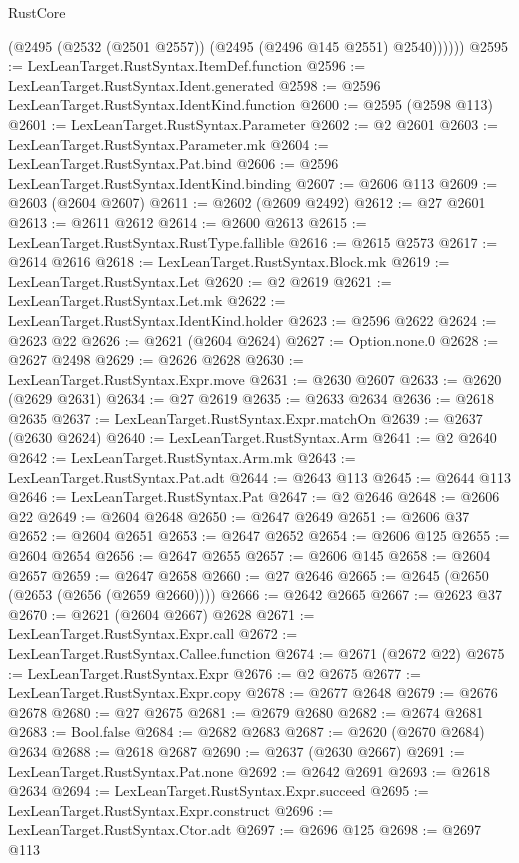 \begin{lexlean}{RustCore}
\begin{coremodule}
            (@2495 (@2532 (@2501 @2557)) (@2495 (@2496 @145 @2551) @2540))))))
@2595 := LexLeanTarget.RustSyntax.ItemDef.function
@2596 := LexLeanTarget.RustSyntax.Ident.generated
@2598 := @2596 LexLeanTarget.RustSyntax.IdentKind.function
@2600 := @2595 (@2598 @113)
@2601 := LexLeanTarget.RustSyntax.Parameter
@2602 := @2 @2601
@2603 := LexLeanTarget.RustSyntax.Parameter.mk
@2604 := LexLeanTarget.RustSyntax.Pat.bind
@2606 := @2596 LexLeanTarget.RustSyntax.IdentKind.binding
@2607 := @2606 @113
@2609 := @2603 (@2604 @2607)
@2611 := @2602 (@2609 @2492)
@2612 := @27 @2601
@2613 := @2611 @2612
@2614 := @2600 @2613
@2615 := LexLeanTarget.RustSyntax.RustType.fallible
@2616 := @2615 @2573
@2617 := @2614 @2616
@2618 := LexLeanTarget.RustSyntax.Block.mk
@2619 := LexLeanTarget.RustSyntax.Let
@2620 := @2 @2619
@2621 := LexLeanTarget.RustSyntax.Let.mk
@2622 := LexLeanTarget.RustSyntax.IdentKind.holder
@2623 := @2596 @2622
@2624 := @2623 @22
@2626 := @2621 (@2604 @2624)
@2627 := Option.none.{0}
@2628 := @2627 @2498
@2629 := @2626 @2628
@2630 := LexLeanTarget.RustSyntax.Expr.move
@2631 := @2630 @2607
@2633 := @2620 (@2629 @2631)
@2634 := @27 @2619
@2635 := @2633 @2634
@2636 := @2618 @2635
@2637 := LexLeanTarget.RustSyntax.Expr.matchOn
@2639 := @2637 (@2630 @2624)
@2640 := LexLeanTarget.RustSyntax.Arm
@2641 := @2 @2640
@2642 := LexLeanTarget.RustSyntax.Arm.mk
@2643 := LexLeanTarget.RustSyntax.Pat.adt
@2644 := @2643 @113
@2645 := @2644 @113
@2646 := LexLeanTarget.RustSyntax.Pat
@2647 := @2 @2646
@2648 := @2606 @22
@2649 := @2604 @2648
@2650 := @2647 @2649
@2651 := @2606 @37
@2652 := @2604 @2651
@2653 := @2647 @2652
@2654 := @2606 @125
@2655 := @2604 @2654
@2656 := @2647 @2655
@2657 := @2606 @145
@2658 := @2604 @2657
@2659 := @2647 @2658
@2660 := @27 @2646
@2665 := @2645 (@2650 (@2653 (@2656 (@2659 @2660))))
@2666 := @2642 @2665
@2667 := @2623 @37
@2670 := @2621 (@2604 @2667) @2628
@2671 := LexLeanTarget.RustSyntax.Expr.call
@2672 := LexLeanTarget.RustSyntax.Callee.function
@2674 := @2671 (@2672 @22)
@2675 := LexLeanTarget.RustSyntax.Expr
@2676 := @2 @2675
@2677 := LexLeanTarget.RustSyntax.Expr.copy
@2678 := @2677 @2648
@2679 := @2676 @2678
@2680 := @27 @2675
@2681 := @2679 @2680
@2682 := @2674 @2681
@2683 := Bool.false
@2684 := @2682 @2683
@2687 := @2620 (@2670 @2684) @2634
@2688 := @2618 @2687
@2690 := @2637 (@2630 @2667)
@2691 := LexLeanTarget.RustSyntax.Pat.none
@2692 := @2642 @2691
@2693 := @2618 @2634
@2694 := LexLeanTarget.RustSyntax.Expr.succeed
@2695 := LexLeanTarget.RustSyntax.Expr.construct
@2696 := LexLeanTarget.RustSyntax.Ctor.adt
@2697 := @2696 @125
@2698 := @2697 @113

\end{coremodule}
\end{lexlean}
